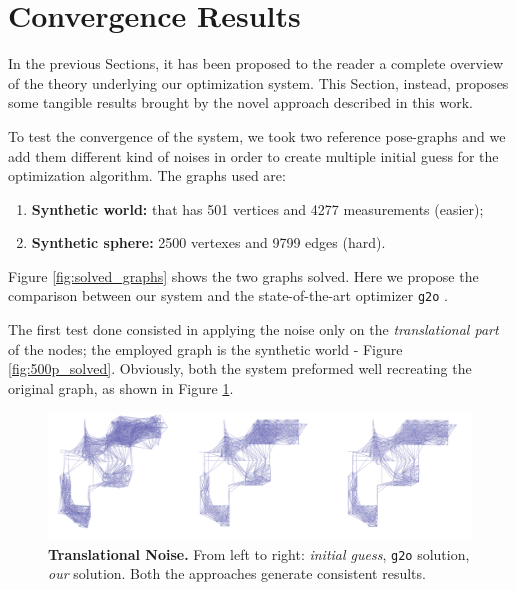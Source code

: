 \section{Convergence Results}\label{sec:convergence_results}
In the previous Sections, it has been proposed to the reader a complete overview of the theory underlying our optimization system. This Section, instead, proposes some tangible results brought by the novel approach described in this work.

To test the convergence of the system, we took two reference pose-graphs and we add them different kind of noises in order to create multiple initial guess for the optimization algorithm. The graphs used are:

\begin{enumerate}
    \item \textbf{Synthetic world:} that has 501 vertices and 4277 measurements (easier);
    \item \textbf{Synthetic sphere:} 2500 vertexes and 9799 edges (hard).
\end{enumerate}

\noindent Figure \ref{fig:solved_graphs} shows the two graphs solved.
Here we propose the comparison between our system and the state-of-the-art optimizer \texttt{g2o} \cite{kummerle2011g}.

The first test done consisted in applying the noise only on the \textit{translational part} of the nodes; the employed graph is the synthetic world - Figure \ref{fig:500p_solved}. Obviously, both the system preformed well recreating the original graph, as shown in Figure \ref{fig:500p_st_solution}.

\begin{figure}[!hbt]
    \centering
    \includegraphics[width=\textwidth]{figures/04_solvingSe3/viewer_500p_st_SOLVED.png}
    \caption{\textbf{Translational Noise.} From left to right: \textit{initial guess}, \texttt{g2o} solution, \textit{our} solution. Both the approaches generate consistent results.} 
    \label{fig:500p_st_solution}
\end{figure}

